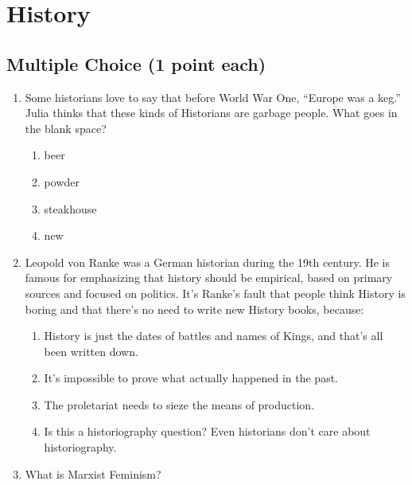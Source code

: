 \documentclass[11pt]{exam}
\begin{document}
\begin{questions}
\begin{enumerate}
\end{enumerate}





\newpage
\section{History}

\subsection{Multiple Choice (1 point each)}

\begin{enumerate}



\item Some historians love to say that before World War One, ``Europe was a
\underline{\hspace{2cm}} keg.'' Julia thinks that these kinds of Historians
are garbage people. What goes in the blank space?

\begin{enumerate}
\item beer
\item powder
\item steakhouse
\item new
\end{enumerate}




\item Leopold von Ranke was a German historian during the 19th century. He is famous for
emphasizing that history should be empirical, based on primary sources and focused on politics.
It’s Ranke's fault that people think History is boring and that there’s no need to write new
History books, because:

\begin{enumerate}
\item History is just the dates of battles and names of Kings, and that’s all been written down.
\item It’s impossible to prove what actually happened in the past.
\item The proletariat needs to sieze the means of production.
\item Is this a historiography question? Even historians don’t care about historiography.
\end{enumerate}




\item What is Marxist Feminism?


\end{enumerate}
\end{questions}
\end{document}
